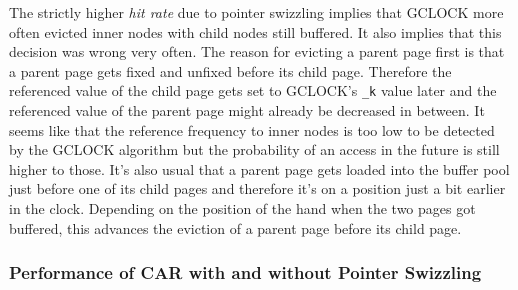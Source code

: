 	The strictly higher \emph{hit rate} due to pointer swizzling implies that GCLOCK more often evicted inner nodes with child nodes still buffered. It also implies that this decision was wrong very often. The reason for evicting a parent page first is that a parent page gets fixed and unfixed before its child page. Therefore the referenced value of the child page gets set to GCLOCK's \lstinline{_k} value later and the referenced value of the parent page might already be decreased in between. It seems like that the reference frequency to inner nodes is too low to be detected by the GCLOCK algorithm but the probability of an access in the future is still higher to those. It's also usual that a parent page gets loaded into the buffer pool just before one of its child pages and therefore it's on a position just a bit earlier in the clock. Depending on the position of the hand when the two pages got buffered, this advances the eviction of a parent page before its child page.
	
\subsubsection{Performance of CAR with and without Pointer Swizzling}

